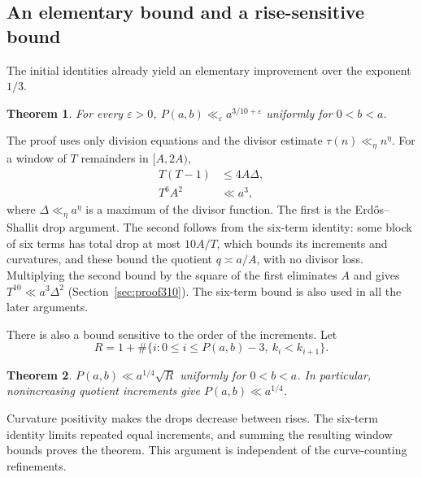 \documentclass[11pt]{article}
\newtheorem{theorem}{Theorem}[section]
\theoremstyle{definition}
\theoremstyle{remark}
\begin{document}
\subsection*{An elementary bound and a rise-sensitive bound}
The initial identities already yield an elementary improvement over the
exponent $1/3$.
\begin{theorem}\label{thm:main}
For every $\varepsilon>0$, $P(a,b)\ll_\varepsilon a^{3/10+\varepsilon}$
uniformly for $0<b<a$.
\end{theorem}
The proof uses only division equations and the divisor estimate
$\tau(n)\ll_\eta n^\eta$. For a window of $T$ remainders in $[A,2A)$,
\begin{align}
 T(T-1)&\le4A\Delta,\label{eq:intro1}\\
 T^6A^2&\ll a^3,\label{eq:intro3}
\end{align}
where $\Delta\ll_\eta a^\eta$ is a maximum of the divisor function. The first
is the Erd\H{o}s--Shallit drop argument. The second follows from the six-term
identity: some block of six terms has total drop at most $10A/T$, which bounds
its increments and curvatures, and these bound the quotient $q\asymp a/A$,
with no divisor loss. Multiplying the second
bound by the square of the first eliminates $A$ and gives
$T^{10}\ll a^3\Delta^2$ (Section~\ref{sec:proof310}). The six-term bound is
also used in all the later arguments.

There is also a bound sensitive to the order of the increments. Let
\[
 R=1+\#\{i:0\le i\le P(a,b)-3,\ k_i<k_{i+1}\}.
\]
\begin{theorem}\label{thm:rises}
$P(a,b)\ll a^{1/4}\sqrt R$ uniformly for $0<b<a$. In particular,
nonincreasing quotient increments give $P(a,b)\ll a^{1/4}$.
\end{theorem}
Curvature positivity makes the drops decrease between rises. The six-term
identity limits repeated equal increments, and summing the resulting
window bounds proves the theorem. This argument is independent of the
curve-counting refinements.
\end{document}
